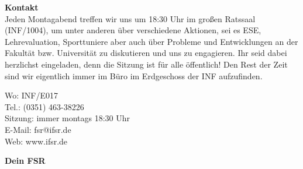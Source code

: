 \textbf{Kontakt} \\
Jeden Montagabend treffen wir uns um 18:30 Uhr im großen Ratssaal (INF/1004), um unter anderen über verschiedene Aktionen, sei es ESE, Lehrevaluation, Sporttuniere aber auch über Probleme und Entwicklungen an der Fakultät bzw. Universität zu diskutieren und uns zu engagieren.
Ihr seid dabei herzlichst eingeladen, denn die Sitzung ist für alle öffentlich!
Den Rest der Zeit sind wir eigentlich immer im Büro im Erdgeschoss der INF aufzufinden.

Wo: INF/E017 \\
Tel.: (0351) 463-38226 \\
Sitzung: immer montags 18:30 Uhr \\
E-Mail: fsr@ifsr.de \\
Web: www.ifsr.de

\textbf{Dein FSR}


